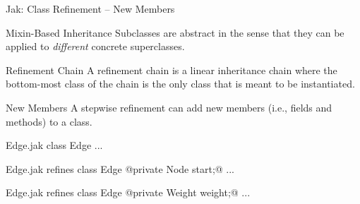 \begin{frame}[fragile]{Jak: Class Refinement -- New Members} %
	\begin{mycolumns}[animation=none]
		\begin{definition}{Mixin-Based Inheritance} %
			Subclasses are abstract in the sense that they can be applied to \emph{different} concrete superclasses.
		\end{definition}
		\begin{definition}{Refinement Chain}
			A refinement chain is a linear inheritance chain where the bottom-most class of the chain is the only class that is meant to be instantiated.
		\end{definition}
		\begin{definition}{New Members}
			A stepwise refinement can add new members (i.e., fields and methods) to a class.
		\end{definition}
	\mynextcolumn
\begin{codetight}{Edge.jak}
class Edge {
	...
}
\end{codetight}
\begin{codetight}{Edge.jak}
refines class Edge {
	@private Node start;@
	...
}
\end{codetight}
\begin{codetight}{Edge.jak}
refines class Edge {
	@private Weight weight;@
	...
}
\end{codetight}
	\end{mycolumns}
\end{frame}

